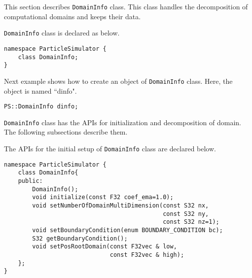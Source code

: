 
This section describes {\tt DomainInfo} class. This class handles
the decomposition of computational domains and keeps their data.



{\tt DomainInfo} class is declared as below.

\begin{lstlisting}[caption=DomainInfo0]
namespace ParticleSimulator {
    class DomainInfo;
}
\end{lstlisting}


Next example shows how to create an object of {\tt DomainInfo} class.
Here, the object is named ``dinfo".

\begin{screen}
\begin{verbatim}
PS::DomainInfo dinfo;
\end{verbatim}
\end{screen}




{\tt DomainInfo} class has the APIs for initialization and
decomposition of domain. The following subsections describe them.



The APIs for the initial setup of {\tt DomainInfo} class are declared
below.

\begin{lstlisting}[caption=DomainInfo1]
namespace ParticleSimulator {
    class DomainInfo{
    public:
        DomainInfo();
        void initialize(const F32 coef_ema=1.0);
        void setNumberOfDomainMultiDimension(const S32 nx,
                                             const S32 ny,
                                             const S32 nz=1);
        void setBoundaryCondition(enum BOUNDARY_CONDITION bc);
        S32 getBoundaryCondition();
        void setPosRootDomain(const F32vec & low,
                              const F32vec & high);
    };
}
\end{lstlisting}

